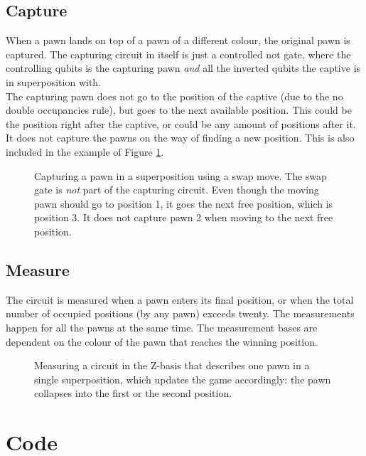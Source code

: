 \documentclass[final,5p,times,twocolumn,authoryear]{elsarticle}
\begin{document}
\subsection{Capture}
When a pawn lands on top of a pawn of a different colour, the original pawn is captured. The capturing circuit in itself is just a controlled not gate, where the controlling qubits is the capturing pawn \textit{and} all the inverted qubits the captive is in superposition with. \\
The capturing pawn does not go to the position of the captive (due to the no double occupancies rule), but goes to the next available position. This could be the position right after the captive, or could be any amount of positions after it. It does not capture the pawns on the way of finding a new position. This is also included in the example of Figure \ref{fig:capture_move}.
\begin{figure}[H]
    \centering
    
    \vspace{-0.9cm}
    \caption{Capturing a pawn in a superposition using a swap move. The swap gate is \textit{not} part of the capturing circuit. Even though the moving pawn should go to position 1, it goes the next free position, which is position 3. It does not capture pawn 2 when moving to the next free position.}
    \label{fig:capture_move}
\end{figure}

\subsection{Measure}
The circuit is measured when a pawn enters its final position, or when the total number of occupied positions (by any pawn) exceeds twenty. The measurements happen for all the pawns at the same time. The measurement bases are dependent on the colour of the pawn that reaches the winning position. 

\begin{figure}[H]
    \centering
    
    \vspace{-0.9cm}
    \caption{Measuring a circuit in the Z-basis that describes one pawn in a single superposition, which updates the game accordingly: the pawn collapses into the first or the second position.}
    \label{fig:measure_move}
\end{figure}


\section{Code}\label{QuantumCode}
\end{document}
